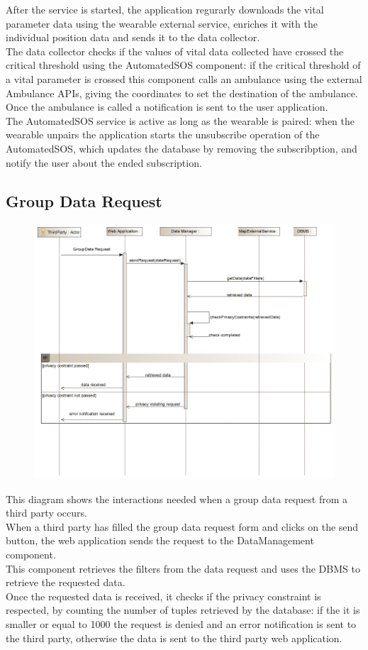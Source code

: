 After the service is started, the application regurarly downloads the vital parameter data using the wearable external service, enriches it with the individual position data and sends it to the data collector.\\
The data collector checks if the values of vital data collected have crossed the critical threshold using the AutomatedSOS component: if the critical threshold of a vital parameter is crossed this component calls an ambulance using the external Ambulance APIs, giving the coordinates to set the destination of the ambulance.\\
Once the ambulance is called a notification is sent to the user application.\\
The AutomatedSOS service is active as long as the wearable is paired: when the wearable unpairs the application starts the unsubscribe operation of the AutomatedSOS, which updates the database by removing the subscribption, and notify the user about the ended subscription.



\subsection{Group Data Request}
\begin{figure}[H]
\centering
\includegraphics[width=\linewidth]{resources/uml/sequence/RequestGroupData.png}
\end{figure}
This diagram shows the interactions needed when a group data request from a third party occurs.\\
When a third party has filled the group data request form and clicks on the send button, the web application sends the request to the DataManagement component.\\
This component retrieves the filters from the data request and uses the DBMS to retrieve the requested data.\\
Once the requested data is received, it checks if the privacy constraint is respected, by counting the number of tuples retrieved by the database: if the it is smaller or equal to 1000 the request is denied and an error notification is sent to the third party, otherwise the data is sent to the third party web application.

